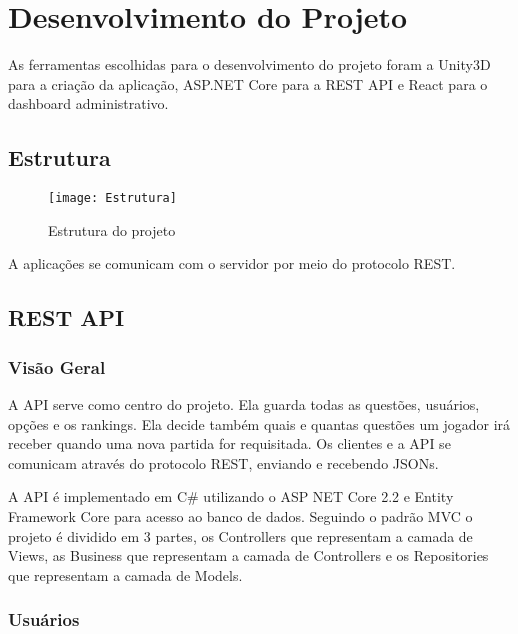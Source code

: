 \chapter{Desenvolvimento do Projeto}
\label{chap:desenv}

As ferramentas escolhidas para o desenvolvimento do projeto foram a Unity3D para a criação da aplicação, ASP.NET Core para a REST API e React para o dashboard administrativo.
 
\section{Estrutura}
\label{sec:estrutura}

\begin{figure}[htb]
\caption{\label{fig:estrutura} Estrutura do projeto}
\begin{center}
\texttt{[image: Estrutura]}
\end{center}
\end{figure}

A aplicações se comunicam com o servidor por meio do protocolo REST.

\section{REST API}
\label{sec:restapi}



\subsection{Visão Geral}
\label{subsec:visaogeral}

A API serve como centro do projeto. Ela guarda todas as questões, usuários, opções e os rankings. Ela decide também quais e quantas questões um jogador irá receber quando uma nova partida for requisitada. Os clientes e a API se comunicam através do protocolo REST, enviando e recebendo JSONs.

A API é implementado em C\# utilizando o ASP NET Core 2.2 e Entity Framework Core para acesso ao banco de dados. Seguindo o padrão MVC o projeto é dividido em 3 partes, os Controllers que representam a camada de Views, as Business que representam a camada de Controllers e os Repositories que representam a camada de Models.

\subsection{Usuários}
\label{subsec:usuários}

